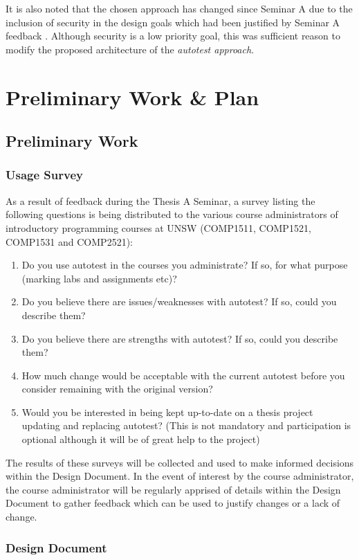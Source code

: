 \documentclass[hidelinks]{report}
\newcommand{\unchapter}[2]{
    \setcounter{chapter}{#1}
    \setcounter{section}{0}
    \chapter*{#2}
    \addcontentsline{toc}{chapter}{#2}
}
\begin{document}
It is also noted that the chosen approach has changed since Seminar A due to the inclusion of security in the design goals which had been justified by Seminar A feedback \cite{AutotestConversation}. Although security is a low priority goal, this was sufficient reason to modify the proposed architecture of the \textit{autotest approach}.

\unchapter{5}{Preliminary Work \& Plan}

\section{Preliminary Work}

\subsection{Usage Survey}

As a result of feedback during the Thesis A Seminar, a survey listing the following questions is being distributed to the various course administrators of introductory programming courses at UNSW (COMP1511, COMP1521, COMP1531 and COMP2521):
\begin{enumerate}
	\item Do you use autotest in the courses you administrate? If so, for what purpose (marking labs and assignments etc)?
	\item Do you believe there are issues/weaknesses with autotest? If so, could you describe them?
	\item Do you believe there are strengths with autotest? If so, could you describe them?
	\item How much change would be acceptable with the current autotest before you consider remaining with the original version?
	\item Would you be interested in being kept up-to-date on a thesis project updating and replacing autotest? (This is not mandatory and participation is optional although it will be of great help to the project)
\end{enumerate}

The results of these surveys will be collected and used to make informed decisions within the Design Document. In the event of interest by the course administrator, the course administrator will be regularly apprised of details within the Design Document to gather feedback which can be used to justify changes or a lack of change.

\subsection{Design Document}
\end{document}
